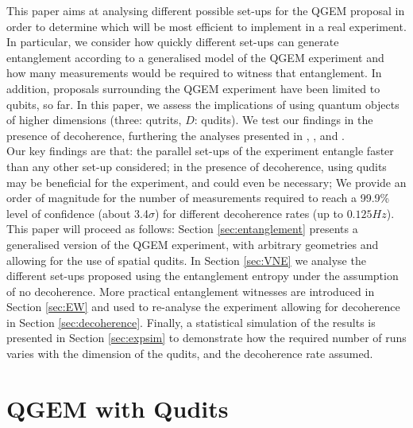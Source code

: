 \documentclass[%
 reprint,
 superscriptaddress,
 amsmath,
 amssymb,
 aps,
 longbibliography
]{revtex4-2}
\begin{document}
\indent This paper aims at analysing different possible set-ups for the QGEM proposal in order to determine which will be most efficient to implement in a real experiment. In particular, we consider how quickly different set-ups can generate entanglement according to a generalised model of the QGEM experiment and how many measurements would be required to witness that entanglement. In addition, proposals surrounding the QGEM experiment have been limited to qubits, so far. In this paper, we assess the implications of using quantum objects of higher dimensions (three: qutrits, $D$: qudits). We test our findings in the presence of decoherence, furthering the analyses presented in \cite{Nguyen2019}, \cite{Chevalier:2020uvv}, \cite{Kamp2020} and \cite{torovs2020relative}. \\
\indent Our key findings are that: the parallel set-ups \cite{Nguyen2019} of the experiment entangle faster than any other set-up considered; in the presence of decoherence, using qudits may be beneficial for the experiment, and could even be necessary; We provide an order of magnitude for the number of measurements required to reach a 99.9\% level of confidence (about 3.4$\sigma$) for different decoherence rates (up to $0.125Hz$). \\
\indent This paper will proceed as follows: Section \ref{sec:entanglement} presents a generalised version of the QGEM experiment, with arbitrary geometries and allowing for the use of spatial qudits. In Section \ref{sec:VNE} we analyse the different set-ups proposed using the entanglement entropy under the assumption of no decoherence. More practical entanglement witnesses are introduced in Section \ref{sec:EW} and used to re-analyse the experiment allowing for decoherence in Section \ref{sec:decoherence}. Finally, a statistical simulation of the results is presented in Section \ref{sec:expsim} to demonstrate how the required number of runs varies with the dimension of the qudits, and the decoherence rate assumed.


\section{QGEM with Qudits \label{sec:entanglement}}
\end{document}
